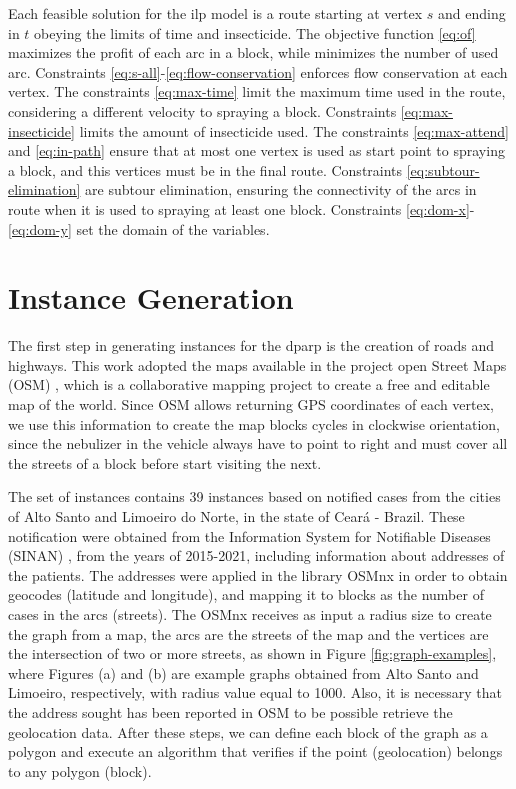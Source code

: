 \documentclass[a4paper,11pt]{article}
\begin{document}
Each feasible solution for the \gls{ilp} model is a route starting at vertex $s$
and ending  in $t$  obeying the  limits of time  and insecticide.  The objective
function  \eqref{eq:of} maximizes  the profit  of each  arc in  a block,  while
minimizes       the      number       of      used       arc.      Constraints
\eqref{eq:s-all}-\eqref{eq:flow-conservation} enforces flow conservation at each
vertex. The constraints  \eqref{eq:max-time} limit the maximum time  used in the
route,  considering  a  different  velocity to  spraying  a  block.  Constraints
\eqref{eq:max-insecticide}   limits  the   amount  of   insecticide  used.   The
constraints \eqref{eq:max-attend} and \eqref{eq:in-path} ensure that at most one
vertex is used as start point to spraying  a block, and this vertices must be in
the   final  route.   Constraints  \eqref{eq:subtour-elimination}   are  subtour
elimination, ensuring the connectivity of the arcs  in route when it is used to
spraying at  least one block. Constraints  \eqref{eq:dom-x}-\eqref{eq:dom-y} set
the domain of the variables.

\section{Instance Generation} \label{sec:instance-generation}

The first  step in generating instances  for the \gls{dparp} is  the creation of
roads and  highways. This work  adopted the maps  available in the  project open
Street Maps (OSM) \citep{haklay:2008}, which  is a collaborative mapping project
to create a free  and editable map of the world. Since  OSM allows returning GPS
coordinates of  each vertex, we  use this information  to create the  map blocks
cycles in clockwise orientation, since the  nebulizer in the vehicle always have
to  point to  right and  must cover  all  the streets  of a  block before  start
visiting the next.

The set  of instances  contains 39  instances based on  notified cases  from the
cities of  Alto Santo and  Limoeiro do  Norte, in the  state of Ceará  - Brazil.
These  notification were  obtained from  the Information  System for  Notifiable
Diseases (SINAN) \citep{laguardia:2004}, from  the years of 2015-2021, including
information about addresses  of the patients. The addresses were  applied in the
library  OSMnx \citep{boeing:2017}  in order  to obtain  geocodes (latitude  and
longitude),  and mapping  it to  blocks  as the  number  of cases  in the  arcs
(streets). The OSMnx receives as input a  radius size to create the graph from a
map, the arcs are the streets of  the map and the vertices are the intersection
of  two or  more streets,  as  shown in  Figure \ref{fig:graph-examples},  where
Figures (a)  and (b) are example  graphs obtained from Alto  Santo and Limoeiro,
respectively, with  radius value equal to  1000. Also, it is  necessary that the
address sought has been reported in  OSM to be possible retrieve the geolocation
data. After these steps, we can define each  block of the graph as a polygon and
execute an  algorithm that verifies  if the  point (geolocation) belongs  to any
polygon (block).
\end{document}
